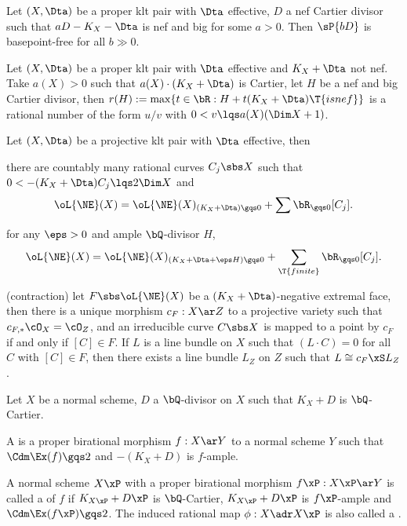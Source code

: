 \documentclass[article, a4paper, twoside]{universal}
\begin{document}
\begin{thm}
	Let $(X,\Dta)$ be a proper klt pair with $\Dta$ effective, $D$ a nef Cartier divisor such that $aD-K_{X}-\Dta$ is nef and big for some $a>0$. Then $\sP{bD}$ is basepoint-free for all $b\gg0$.
\end{thm}

\begin{thm}[Rationality, 3.5]
	Let $(X,\Dta)$ be a proper klt pair with $\Dta$ effective and $K_{X}+\Dta$ not nef. Take $a(X)>0$ such that $a(X)\cdot(K_{X}+\Dta)$ is Cartier, let $H$ be a nef and big Cartier divisor, then $r(H):=\max\{t\in\bR:H+t(K_{X}+\Dta)\T{ is nef}\}$ is a rational number of the form $u/v$ with $0<v\lqs a(X)(\Dim X+1)$.
\end{thm}

\begin{thm}
	Let $(X,\Dta)$ be a projective klt pair with $\Dta$ effective, then
	\begin{enr}[label=(\arabic*)]
		\item there are countably many rational curves $C_{j}\sbs X$ such that $0<-(K_{X}+\Dta)C_{j}\lqs2\Dim X$ and
		\[
			\oL{\NE}(X)=\oL{\NE}(X)_{(K_{X}+\Dta)\gqs0}+\sum\bR_{\gqs0}[C_{j}].
		\]
		\item for any $\eps>0$ and ample $\bQ$-divisor $H$,
		\[
			\oL{\NE}(X)=\oL{\NE}(X)_{(K_{X}+\Dta+\eps H)\gqs0}+\sum_{\T{finite}}\bR_{\gqs0}[C_{j}].
		\]
		\item (contraction) let $F\sbs\oL{\NE}(X)$ be a $(K_{X}+\Dta)$-negative extremal face, then there is a unique morphism $c_{F}:X\ar Z$ to a projective variety such that $c_{F,*}\cO_{X}=\cO_{Z}$, and an irreducible curve $C\sbs X$ is mapped to a point by $c_{F}$ if and only if $[C]\in F$. If $L$ is a line bundle on $X$ such that $(L\cdot C)=0$ for all $C$ with $[C]\in F$, then there exists a line bundle $L_{Z}$ on $Z$ such that $L\cong c_{F}\xS L_{Z}$.
	\end{enr}
\end{thm}

\begin{dfn}[Flip, 3.33]
	Let $X$ be a normal scheme, $D$ a $\bQ$-divisor on $X$ such that $K_{X}+D$ is $\bQ$-Cartier.

	A  is a proper birational morphism $f:X\ar Y$ to a normal scheme $Y$ such that $\Cdm\Ex(f)\gqs2$ and $-(K_{X}+D)$ is $f$-ample.

	A normal scheme $X\xP$ with a proper birational morphism $f\xP:X\xP\ar Y$ is called a  of $f$ if $K_{X\xP}+D\xP$ is $\bQ$-Cartier, $K_{X\xP}+D\xP$ is $f\xP$-ample and $\Cdm\Ex(f\xP)\gqs2$. The induced rational map $\phi:X\adr X\xP$ is also called a .
\end{dfn}
\end{document}
